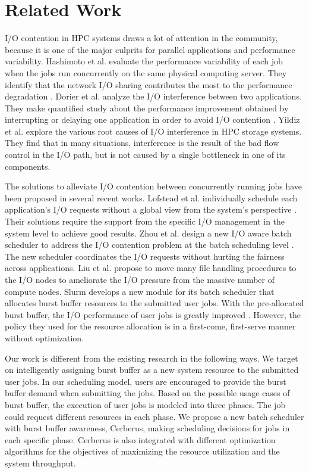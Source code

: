 \section{Related Work}
\label{Sec:RelatedWorks}

I/O contention in HPC systems draws a lot of attention in the community,
because it is one of the major culprits for parallel applications and performance variability.
Hashimoto et al. evaluate the performance variability of each job
when the jobs run concurrently on the same physical computing server.
They identify that the network I/O sharing contributes the most to
the performance degradation \cite{hashimoto:ICNC:2012}.
Dorier et al. analyze the I/O interference between two applications.
They make quantified study about the performance improvement obtained
by interrupting or delaying one application in order to avoid I/O contention \cite{dorier:IPDPS:2014}.
Yildiz et al. \cite{yildiz:IPDPS:2016} explore the various root causes
of I/O interference in HPC storage systems.
They find that in many situations, interference is the result of the bad flow control in the I/O path,
but is not caused by a single bottleneck in one of its components.

The solutions to alleviate I/O contention between concurrently
running jobs have been proposed in several recent works.
Lofstead et al. individually schedule each application's I/O requests without
a global view from the system's perspective \cite{lofstead:sc:2010}.
Their solutions require the support from the specific I/O management
in the system level to achieve good results.
Zhou et al. design a new I/O aware batch scheduler to address the I/O
contention problem at the batch scheduling level \cite{zhou:Cluster:2015}.
The new scheduler coordinates the  I/O requests without hurting the fairness across applications.
Liu et al. propose to move many file handling procedures to the I/O nodes to
ameliorate the I/O pressure from the massive number of compute nodes\cite{Liu:MSST:2012}.
Slurm develops a new module for its batch scheduler that allocates burst buffer
resources to the submitted user jobs. With the pre-allocated burst buffer,
the I/O performance of user jobs is greatly improved \cite{SlurmBBGuide}.
However, the policy they used for the resource allocation is in a first-come, first-serve manner without optimization.

Our work is different from the existing research in the following ways.
We target on intelligently assigning burst buffer as a new system resource to the submitted user jobs.
In our scheduling model, users are encouraged to provide the burst buffer demand when submitting the jobs.
Based on the possible usage cases of burst buffer, the execution of user jobs is modeled into three phases.
The job could request different resources in each phase.
We propose a new batch scheduler with burst buffer awareness, Cerberus,
making scheduling decisions for jobs in each specific phase.
Cerberus is also integrated with different optimization algorithms for the objectives of maximizing the resource utilization and the system throughput.




